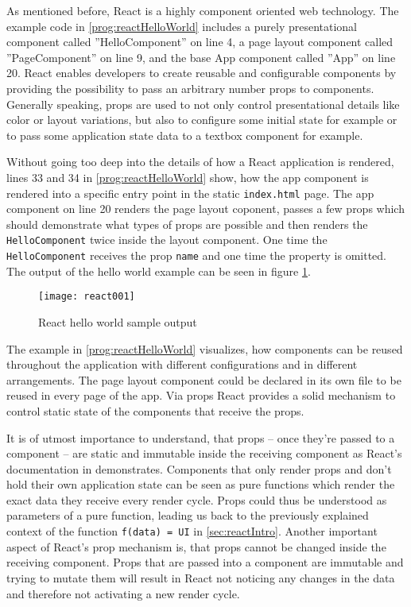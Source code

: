 As mentioned before, React is a highly component oriented web technology. The example code in \ref{prog:reactHelloWorld} includes a purely presentational component called ''HelloComponent'' on line 4, a page layout component called ''PageComponent'' on line 9, and the base App component called ''App'' on line 20. React enables developers to create reusable and configurable components by providing the possibility to pass an arbitrary number props to components. Generally speaking, props are used to not only control presentational details like color or layout variations, but also to configure some initial state for example or to pass some application state data to a textbox component for example.

Without going too deep into the details of how a React application is rendered, lines 33 and 34 in \ref{prog:reactHelloWorld} show, how the app component is rendered into a specific entry point in the static \texttt{index.html} page. The app component on line 20 renders the page layout coponent, passes a few props which should demonstrate what types of props are possible and then renders the \texttt{HelloComponent} twice inside the layout component. One time the \texttt{HelloComponent} receives the prop \texttt{name} and one time the property is omitted. The output of the hello world example can be seen in figure \ref{fig:reactHelloWorld}. 

\begin{figure}
  \centering
  \texttt{[image: react001]}
  \caption{React hello world sample output}
  \label{fig:reactHelloWorld}
\end{figure}

The example in \ref{prog:reactHelloWorld} visualizes, how components can be reused throughout the application with different configurations and in different arrangements. The page layout component could be declared in its own file to be reused in every page of the app. Via props React provides a solid mechanism to control static state of the components that receive the props.

It is of utmost importance to understand, that props -- once they're passed to a component -- are static and immutable inside the receiving component as React's documentation in \cite[/docs/components-and-props.html\#props-are-read-only]{React} demonstrates. Components that only render props and don't hold their own application state can be seen as pure functions which render the exact data they receive every render cycle. Props could thus be understood as parameters of a pure function, leading us back to the previously explained context of the function \texttt{f(data) = UI} in \ref{sec:reactIntro}. Another important aspect of React's prop mechanism is, that props cannot be changed inside the receiving component. Props that are passed into a component are immutable and trying to mutate them will result in React not noticing any changes in the data and therefore not activating a new render cycle.

